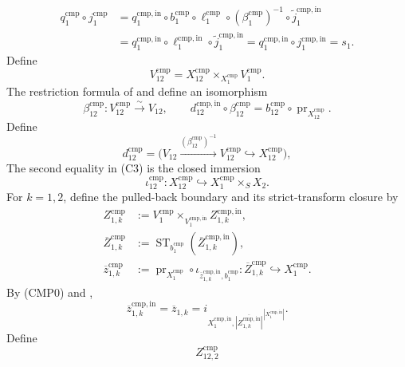 \begin{definition}
\[\begin{aligned}
    q_1^{\mathrm{cmp}}\circ j_1^{\mathrm{cmp}}
      &=q_1^{\mathrm{cmp,in}}\circ b_1^{\mathrm{cmp}}
          \circ\ell_1^{\mathrm{cmp}}
          \circ(\beta_1^{\mathrm{cmp}})^{-1}
          \circ\widetilde j_1^{\mathrm{cmp,in}}\\
      &=q_1^{\mathrm{cmp,in}}\circ\ell_1^{\mathrm{cmp,in}}
          \circ\widetilde j_1^{\mathrm{cmp,in}}
       =q_1^{\mathrm{cmp,in}}\circ j_1^{\mathrm{cmp,in}}
       =s_1.
  \end{aligned}
  \]
  Define
  \[
    V_{12}^{\mathrm{cmp}}
      =X_{12}^{\mathrm{cmp}}\times_{X_1^{\mathrm{cmp}}}V_1^{\mathrm{cmp}}.
  \]
  The restriction formula of
   and
   define an isomorphism
  \[
    \beta_{12}^{\mathrm{cmp}}\colon
      V_{12}^{\mathrm{cmp}}\xrightarrow{\sim}V_{12},\qquad
    d_{12}^{\mathrm{cmp,in}}\circ\beta_{12}^{\mathrm{cmp}}
      =b_{12}^{\mathrm{cmp}}\circ
        \operatorname{pr}_{X_{12}^{\mathrm{cmp}}}.                \tag{C5}
  \]
  Define
  \[
    d_{12}^{\mathrm{cmp}}
      =\bigl(V_{12}\xrightarrow{(\beta_{12}^{\mathrm{cmp}})^{-1}}
        V_{12}^{\mathrm{cmp}}\hookrightarrow X_{12}^{\mathrm{cmp}}\bigr),
  \]
  The second equality in (C3) is the closed immersion
  \[
    \iota_{12}^{\mathrm{cmp}}\colon X_{12}^{\mathrm{cmp}}
      \hookrightarrow X_1^{\mathrm{cmp}}\times_SX_2.              \tag{C6}
  \]
  For $k=1,2$, define the pulled-back boundary and its strict-transform
  closure by
  \[
  \begin{aligned}
    Z_{1,k}^{\mathrm{cmp}}
      &:=V_1^{\mathrm{cmp}}\times_{V_1^{\mathrm{cmp,in}}}
          Z_{1,k}^{\mathrm{cmp,in}},\\
    \overline Z_{1,k}^{\mathrm{cmp}}
      &:=\operatorname{ST}_{b_1^{\mathrm{cmp}}}
          (\overline Z_{1,k}^{\mathrm{cmp,in}}),\\
    \overline z_{1,k}^{\mathrm{cmp}}
      &:=\operatorname{pr}_{X_1^{\mathrm{cmp}}}\circ
          \iota_{\overline z_{1,k}^{\mathrm{cmp,in}},b_1^{\mathrm{cmp}}}
        \colon\overline Z_{1,k}^{\mathrm{cmp}}\hookrightarrow
          X_1^{\mathrm{cmp}}.
  \end{aligned}                                                     \tag{C7}
  \]
  By (CMP0) and ,
  \[
    \overline z_{1,k}^{\mathrm{cmp,in}}
      =\overline z_{1,k}
      =i_{X_1^{\mathrm{cmp,in}},
          \overline{|Z_{1,k}^{\mathrm{cmp,in}}|}^{\,|X_1^{\mathrm{cmp,in}}|}}.
  \]
  Define
  \[
    Z_{12,2}^{\mathrm{cmp}}
\]
\end{definition}
